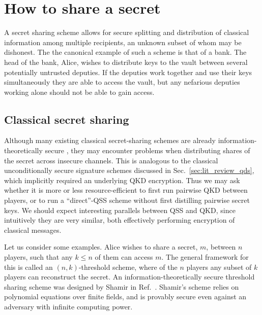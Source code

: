 \section{How to share a secret}\label{sec:qss_lit_review}
A secret sharing scheme allows for secure splitting and distribution of classical information among multiple recipients, an unknown subset of whom may be dishonest. The the canonical example of such a scheme is that of a bank. The head of the bank, Alice, wishes to distribute keys to the vault between several potentially untrusted deputies. If the deputies work together and use their keys simultaneously they are able to access the vault, but any nefarious deputies working alone should not be able to gain access.




\subsection{Classical secret sharing}\label{sec:qss_qcss}
Although many existing classical secret-sharing schemes are already information-theoretically secure \cite{Shamir1976, Blakley1979}, they may encounter problems when distributing  shares of the secret across insecure channels. This is analogous to the classical unconditionally secure signature schemes \cite{Wallden2015, Amiri2015a} discussed in Sec.~\ref{sec:lit_review_qds}, which implicitly required an underlying QKD encryption. Thus we may ask whether it is more or less resource-efficient to first run pairwise QKD between players, or to run a ``direct''-QSS scheme without first distilling pairwise secret keys. We should expect interesting parallels between QSS and QKD, since intuitively they are very similar, both effectively performing encryption of classical messages.

Let us consider some examples. Alice wishes to share a secret, $m$, between $n$ players, such that any $k \le n$ of them can access $m$. The general framework for this is called an $\left(n, k\right)$-threshold scheme, where of the $n$ players any subset of $k$ players can reconstruct the secret. An information-theoretically secure threshold sharing scheme was designed by Shamir in Ref.~\cite{Shamir1976}. Shamir's scheme relies on polynomial equations over finite fields, and is provably secure even against an adversary with infinite computing power. 

